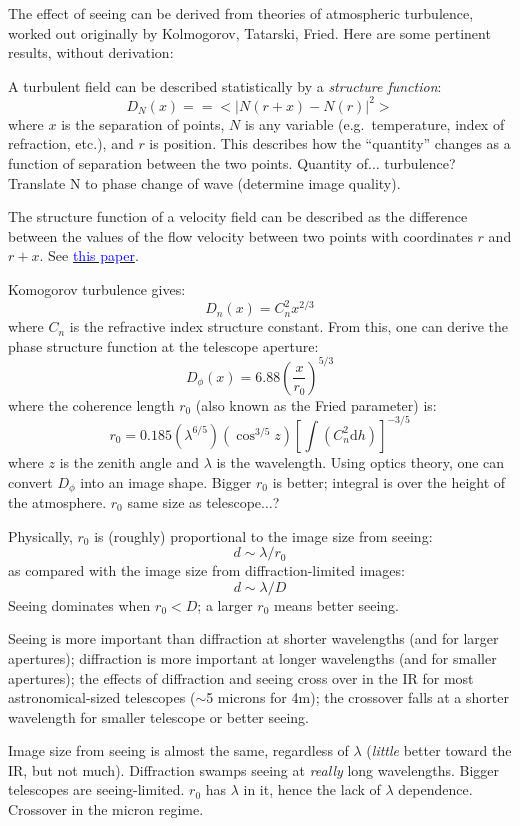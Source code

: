 \documentclass[12pt]{article}
\begin{document}
The effect of seeing can be derived from theories of atmospheric
turbulence, worked out originally by Kolmogorov, Tatarski, Fried.
Here are some pertinent results, without derivation:

A turbulent field can be described statistically by a \emph{structure
function}:
    $$ D_N(x) = = <|N(r+x)-N(r)|^2>  $$
where $x$ is the separation of points, $N$ is any variable (e.g.\
temperature, index of refraction, etc.), and $r$ is position.
This describes how the ``quantity'' changes as a function of separation
between the two points.
\textcolor{myBlue}{Quantity of$\ldots$ turbulence?
Translate N to phase change of wave (determine image quality).}

The structure function of a velocity field can be described as the
difference between the values of the flow velocity between two points
with coordinates $r$ and $r+x$. See
\href{http://jetp.ac.ru/cgi-bin/dn/e_082_03_0580.pdf}
{\textcolor{blue}{this paper}}.

Komogorov turbulence gives:
\[
    D_{n}(x) = C_{n}^2x^{2/3}
    \]
where $C_{n}$ is the refractive index structure constant.
From this, one can derive the phase structure function at the
telescope aperture:
\[
    D_{\phi}(x) = 6.88\left(\frac{x}{r_{0}}\right)^{5/3}
    \]
where the coherence length $r_{0}$ (also known as the Fried parameter)
is:
\[
    r_{0} = 0.185\left( \lambda^{6/5} \right)
    \left( \cos^{3/5}z \right)
    \left[ \int \left( C_{n}^{2}\textrm{d}h \right)\right]^{-3/5}
    \]
where $z$ is the zenith angle and $\lambda$ is the wavelength.
Using optics theory, one can convert $D_{\phi}$ into an image shape.
\textcolor{myBlue}{Bigger $r_{0}$ is better; integral is over the height
of the atmosphere. $r_{0}$ same size as telescope$\ldots$?}

Physically, $r_{0}$ is (roughly) proportional to the image size from
seeing:
\[
    d \sim \lambda/r_{0}
    \]
as compared with the image size from diffraction-limited images:
    $$ d \sim \lambda/D $$
Seeing dominates when $r_{0} < D$; a larger $r_{0}$ means better seeing.

Seeing is more important than diffraction at shorter wavelengths (and
for larger apertures); diffraction is more important at longer
wavelengths (and for smaller apertures); the effects of diffraction
and seeing cross over in the IR for most astronomical-sized telescopes
($\sim$5 microns for 4m); the crossover falls at a shorter wavelength
for smaller telescope or better seeing.

\textcolor{myBlue}{Image size from seeing is almost the same,
regardless of $\lambda$ (\emph{little} better toward the IR, but not
much). Diffraction swamps seeing at \emph{really} long wavelengths.
Bigger telescopes are seeing-limited. $r_{0}$ has $\lambda$ in it, hence
the lack of $\lambda$ dependence. Crossover in the micron regime.
}
\end{document}
